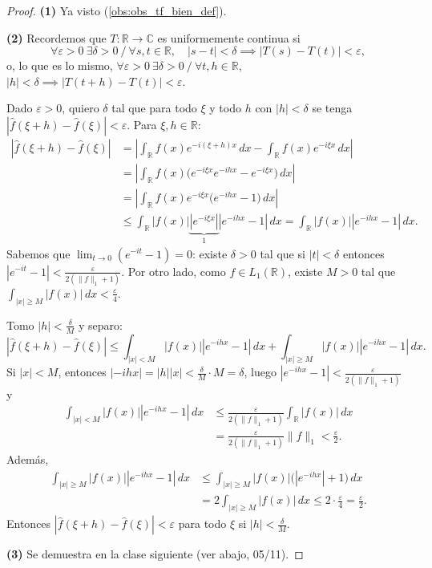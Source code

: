 \begin{proof}
\textbf{(1)} Ya visto (\cref{obs:obs_tf_bien_def}).

\textbf{(2)} Recordemos que $T : \mathbb{R} \to \mathbb{C}$ es uniformemente continua si
\[
\forall\varepsilon > 0\ \exists\delta > 0 \ / \ \forall s, t \in \mathbb{R}, \quad |s - t| < \delta \implies |T(s) - T(t)| < \varepsilon,
\]
o, lo que es lo mismo, $\forall\varepsilon > 0\ \exists\delta > 0 \ / \ \forall t, h \in \mathbb{R}$, $|h| < \delta \implies |T(t+h) - T(t)| < \varepsilon$.

Dado $\varepsilon > 0$, quiero $\delta$ tal que para todo $\xi$ y todo $h$ con $|h| < \delta$ se tenga $|\hat{f}(\xi+h) - \hat{f}(\xi)| < \varepsilon$. Para $\xi, h \in \mathbb{R}$:
\begin{align*}
|\hat{f}(\xi+h) - \hat{f}(\xi)| &= \left|\int_{\mathbb{R}}f(x)e^{-i(\xi+h)x}\,dx - \int_{\mathbb{R}}f(x)e^{-i\xi x}\,dx\right| \\
&= \left|\int_{\mathbb{R}}f(x)\big(e^{-i\xi x}e^{-ihx} - e^{-i\xi x}\big)\,dx\right| \\
&= \left|\int_{\mathbb{R}}f(x)e^{-i\xi x}\big(e^{-ihx} - 1\big)\,dx\right| \\
&\le \int_{\mathbb{R}}|f(x)|\underbrace{|e^{-i\xi x}|}_{1}|e^{-ihx} - 1|\,dx = \int_{\mathbb{R}}|f(x)||e^{-ihx} - 1|\,dx.
\end{align*}
Sabemos que $\lim_{t\to0}(e^{-it} - 1) = 0$: existe $\delta > 0$ tal que si $|t| < \delta$ entonces $|e^{-it} - 1| < \frac{\varepsilon}{2(\|f\|_1 + 1)}$. Por otro lado, como $f \in L_1(\mathbb{R})$, existe $M > 0$ tal que $\int_{|x|\ge M}|f(x)|\,dx < \frac{\varepsilon}{4}$.

Tomo $|h| < \frac{\delta}{M}$ y separo:
\[
|\hat{f}(\xi+h) - \hat{f}(\xi)| \le \int_{|x|<M}|f(x)||e^{-ihx} - 1|\,dx + \int_{|x|\ge M}|f(x)||e^{-ihx} - 1|\,dx.
\]
Si $|x| < M$, entonces $|-ihx| = |h||x| < \frac{\delta}{M}\cdot M = \delta$, luego $|e^{-ihx} - 1| < \frac{\varepsilon}{2(\|f\|_1+1)}$ y
\begin{align*}
\int_{|x|<M}|f(x)||e^{-ihx} - 1|\,dx &\le \frac{\varepsilon}{2(\|f\|_1+1)}\int_{\mathbb{R}}|f(x)|\,dx \\
&= \frac{\varepsilon}{2(\|f\|_1+1)}\|f\|_1 < \frac{\varepsilon}{2}.
\end{align*}
Además,
\begin{align*}
\int_{|x|\ge M}|f(x)||e^{-ihx} - 1|\,dx &\le \int_{|x|\ge M}|f(x)|\big(|e^{-ihx}| + 1\big)\,dx \\
&= 2\int_{|x|\ge M}|f(x)|\,dx \le 2\cdot\frac{\varepsilon}{4} = \frac{\varepsilon}{2}.
\end{align*}
Entonces $|\hat{f}(\xi+h) - \hat{f}(\xi)| < \varepsilon$ para todo $\xi$ si $|h| < \frac{\delta}{M}$.

\textbf{(3)} Se demuestra en la clase siguiente (ver abajo, 05/11).
\end{proof}

